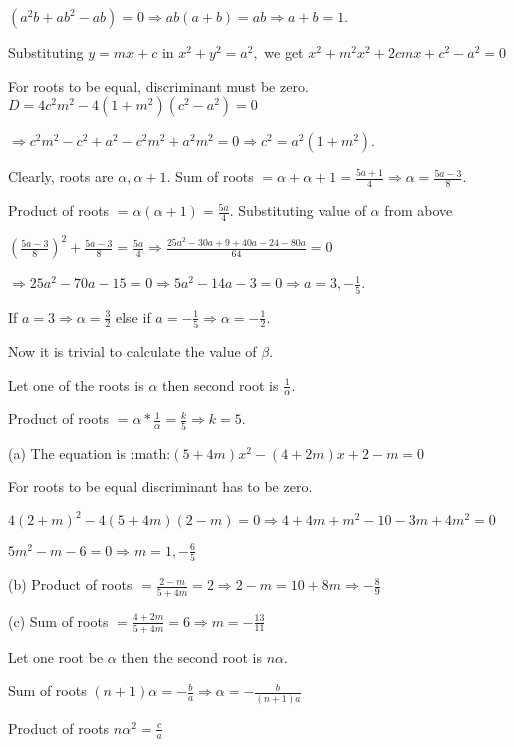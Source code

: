  $(a^2b + ab^2 - ab) = 0\Rightarrow ab(a + b) = ab\Rightarrow a + b = 1$.
\item Substituting $y = mx + c$ in $x^2 + y^2 = a^2,$ we get $x^2 + m^2x^2 + 2cmx + c^2 - a^2 = 0$

  For roots to be equal, discriminant must be zero. $D = 4c^2m^2 - 4(1 + m^2)(c^2 - a^2) = 0$

  $\Rightarrow c^2m^2 - c^2 + a^2 - c^2m^2 + a^2m^2 = 0\Rightarrow c^2 = a^2(1 + m^2)$.
\item Clearly, roots are $\alpha, \alpha + 1$. Sum of roots $= \alpha + \alpha + 1 = \frac{5a +
  1}{4}\Rightarrow \alpha = \frac{5a - 3}{8}$.

  Product of roots $= \alpha(\alpha + 1) = \frac{5a}{4}$. Substituting value of $\alpha$ from above

  $\left(\frac{5a - 3}{8}\right)^2 + \frac{5a - 3}{8} = \frac{5a}{4}\Rightarrow \frac{25a^2 - 30a + 9 + 40a
    - 24 - 80a}{64} = 0$

  $\Rightarrow 25a^2 - 70a - 15 = 0 \Rightarrow 5a^2 - 14a - 3 = 0\Rightarrow a = 3, -\frac{1}{5}$.

  If $a = 3 \Rightarrow \alpha = \frac{3}{2}$ else if $a = -\frac{1}{5} \Rightarrow \alpha = -\frac{1}{2}$.

  Now it is trivial to calculate the value of $\beta$.
\item Let one of the roots is $\alpha$ then second root is $\frac{1}{\alpha}$.

  Product of roots $= \alpha * \frac{1}{\alpha} = \frac{k}{5} \Rightarrow k = 5$.
\item (a) The equation is :math:$(5 + 4m)x^2 - (4 + 2m)x + 2 - m = 0$

  For roots to be equal discriminant has to be zero.

  $4(2 + m)^2 - 4(5 + 4m)(2 - m) = 0\Rightarrow 4 + 4m + m^2 - 10 - 3m + 4m^2 = 0$

  $5m^2 - m - 6 = 0 \Rightarrow m = 1, -\frac{6}{5}$

  (b) Product of roots $= \frac{2 - m}{5 + 4m} = 2 \Rightarrow 2 - m = 10 + 8m \Rightarrow -\frac{8}{9}$

  (c) Sum of roots $= \frac{4 + 2m}{5 + 4m} = 6 \Rightarrow m = -\frac{13}{11}$
\item Let one root be $\alpha$ then the second root is $n\alpha$.

  Sum of roots $(n + 1)\alpha = -\frac{b}{a} \Rightarrow \alpha = -\frac{b}{(n + 1)a}$

  Product of roots $n\alpha^2 = \frac{c}{a}$


